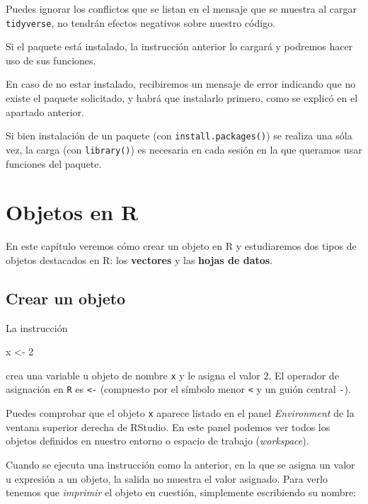 \documentclass[
  title=normal,
  notoc,
  bib=normal]{mnye}
\newenvironment{Shaded}{\begin{snugshade}}{\end{snugshade}}
\newcommand{\DecValTok}[1]{\textcolor[rgb]{0.00,0.00,0.81}{#1}}
\newcommand{\NormalTok}[1]{#1}
\newcommand{\OtherTok}[1]{\textcolor[rgb]{0.56,0.35,0.01}{#1}}
\begin{document}
Puedes ignorar los conflictos que se listan en el mensaje que se muestra al cargar \texttt{tidyverse}, no tendrán efectos negativos sobre nuestro código.

Si el paquete está instalado, la instrucción anterior lo cargará y podremos hacer uso de sus funciones.

En caso de no estar instalado, recibiremos un mensaje de error indicando que no existe el paquete solicitado, y habrá que instalarlo primero, como se explicó en el apartado anterior.

Si bien instalación de un paquete (con \texttt{install.packages()}) se realiza una sóla vez, la carga (con \texttt{library()}) es necesaria en cada sesión en la que queramos usar funciones del paquete.

\hypertarget{objects}{%
\section{Objetos en R}\label{objects}}

En este capítulo veremos cómo crear un objeto en \textsf{R} y estudiaremos dos tipos de objetos destacados en \textsf{R}: los \textbf{vectores} y las \textbf{hojas de datos}.

\hypertarget{crear-un-objeto}{%
\subsection{Crear un objeto}\label{crear-un-objeto}}

La instrucción

\begin{Shaded}
\begin{Highlighting}[]
\NormalTok{x }\OtherTok{\textless{}{-}} \DecValTok{2}
\end{Highlighting}
\end{Shaded}

crea una variable u objeto de nombre \texttt{x} y le asigna el valor \(2\).
El operador de asignación en \texttt{R} es \texttt{\textless{}-} (compuesto por el símbolo menor \texttt{\textless{}} y un guión central \texttt{-}).

Puedes comprobar que el objeto \texttt{x} aparece listado en el panel \emph{Environment} de la ventana superior derecha de \textsf{RStudio}. En este panel podemos ver todos los objetos definidos en nuestro entorno o espacio de trabajo (\emph{workspace}).

Cuando se ejecuta una instrucción como la anterior, en la que se asigna un valor u expresión a un objeto, la salida no muestra el valor asignado. Para verlo tenemos que \emph{imprimir} el objeto en cuestión, simplemente escribiendo su nombre:
\end{document}
